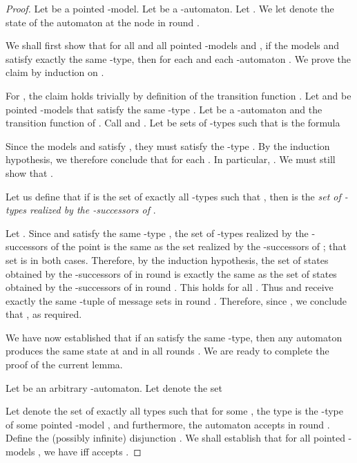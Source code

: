\documentclass[copyright,creativecommons]{eptcs}
\begin{document}
\begin{proof}
Let  be a pointed -model.
Let  be a -automaton.
Let . We let 
denote the state of the automaton  at the node  in round .




We shall first show that for all  and all pointed -models  and ,
if the models  and  satisfy exactly the same -type,
then  
for each  and each -automaton .
We prove the claim by induction on .




For , the claim holds
trivially by definition of the
transition function .
Let  and  be pointed -models that satisfy the same
-type .
Let  be a -automaton and  the transition function of .
Call  and .
Let  be sets of -types such that  is the formula

Since the models  and  satisfy , they must
satisfy the -type . 
By the induction hypothesis, we therefore conclude that 
for each . In particular, .
We must still show that .




Let us define that if  is the set of exactly all -types  such that
, then  is the
\emph{set of -types realized by the -successors of }.




Let .
Since  and  satisfy the same -type ,
the set of  -types realized
by the -successors of the point 
is the same as the set realized by the -successors of ;
that set is  in both cases. Therefore, by the induction hypothesis, the set of
states obtained by the -successors of 
in round  is exactly the same as the set of
states obtained by the -successors of 
in round . This holds for all .
Thus  and  receive exactly the same -tuple of message sets in round .
Therefore, since , we conclude that
, as required.








We have now established that if  an  satisfy the same -type,
then any automaton  produces the same state at  and  in all rounds .
We are ready to complete the proof of the current lemma.




Let  be an arbitrary -automaton.
Let  denote the set 

Let  denote the set of exactly all types  such
that for some , the type  is the -type of 
some pointed -model , and furthermore, the automaton 
accepts  in round . Define the (possibly infinite) disjunction .
We shall establish that for all pointed -models ,
we have  iff 
 accepts . 





\end{proof}
\end{document}

